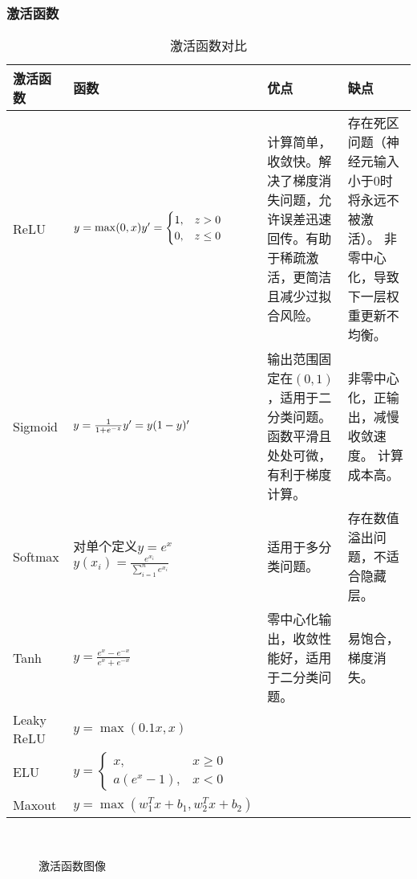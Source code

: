 \documentclass[
12pt, %
a4paper, 
oneside, %
headinclude,footinclude, %
]{scrartcl}
\begin{document}
\subsubsection[激活函数]{激活函数}
\begin{table}[H]
\centering
\begin{tabular}{|p{2cm}|p{5.5cm}|p{4.5cm}|p{4.5cm}|}
\hline
激活函数 & 函数 & 优点 & 缺点 \\
\hline
ReLU & $ y = \max(0, x) \newline y' = \begin{cases} 1, & z > 0 \\ 0, & z \leq 0 \end{cases} $ & 计算简单，收敛快。解决了梯度消失问题，允许误差迅速回传。有助于稀疏激活，更简洁且减少过拟合风险。 & 存在死区问题（神经元输入小于$ 0 $时将永远不被激活）。 \newline 非零中心化，导致下一层权重更新不均衡。 \\
\hline
Sigmoid & $ y = \frac{1}{1 + e^{-z}} \newline y' = y(1 - y)' $ & 输出范围固定在$ (0, 1) $，适用于二分类问题。函数平滑且处处可微，有利于梯度计算。 & 非零中心化，正输出，减慢收敛速度。 \newline 计算成本高。 \\
\hline
Softmax & 对单个定义$ y = e^x $ \newline $ y(x_i) = \frac{e^{x_i}}{\sum_{i = 1}^n e^{x_i}} $ & 适用于多分类问题。 & 存在数值溢出问题，不适合隐藏层。 \\
\hline
Tanh & $ y = \frac{e^x - e^{-x}}{e^x + e^{-x}} $ & 零中心化输出，收敛性能好，适用于二分类问题。 & 易饱合，梯度消失。 \\
\hline
Leaky ReLU & $ y = \max(0.1x, x) $ & & \\
\hline
ELU & $ y = \begin{cases} x, & x \geq 0 \\ a(e^x - 1), & x < 0 \end{cases} $ & & \\
\hline
Maxout & $ y = \max(w_1^T x + b_1, w_2^T x + b_2) $ & & \\
\hline
\end{tabular}
\caption{激活函数对比}
\end{table}

\begin{figure}[H]
\centering
{} \quad
{} \quad
{} \\
 \quad
{} \quad
{}
\caption{激活函数图像}
\end{figure}
\end{document}
